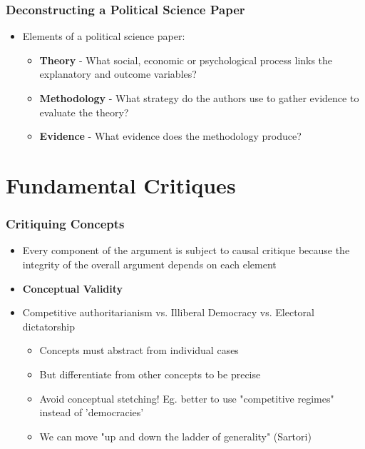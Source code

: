 \documentclass[xcolor=x11names,compress]{beamer}\usepackage[]{graphicx}\usepackage[]{color}
\renewcommand{\(}{\begin{columns}}
\renewcommand{\)}{\end{columns}}
\newcommand{\<}[1]{\begin{column}{#1}}
\renewcommand{\>}{\end{column}}
\begin{document}
\begin{frame}
\frametitle{Deconstructing a Political Science Paper}
\begin{itemize}
\item Elements of a political science paper:
\pause
\begin{itemize}
\item \textbf{Theory} - What social, economic or psychological process links the explanatory and outcome variables? 
\pause
\item \textbf{Methodology} - What strategy do the authors use to gather evidence to evaluate the theory?
\pause
\item \textbf{Evidence} - What evidence does the methodology produce?
\end{itemize}
\end{itemize}
\end{frame}



\section{Fundamental Critiques}

\begin{frame}
\frametitle{Critiquing Concepts}
\begin{itemize}
\item Every component of the argument is subject to causal critique because the integrity of the overall argument depends on each element
\pause
\item \textbf{Conceptual Validity}
\pause
\item Competitive authoritarianism vs. Illiberal Democracy vs. Electoral dictatorship
\pause
\begin{itemize}
\item Concepts must abstract from individual cases
\pause
\item But differentiate from other concepts to be precise
\pause
\item Avoid conceptual stetching! Eg. better to use "competitive regimes" instead of 'democracies'
\pause
\item We can move "up and down the ladder of generality" (Sartori)
\pause
\end{itemize}
\end{itemize}
\end{frame}
\end{document}
